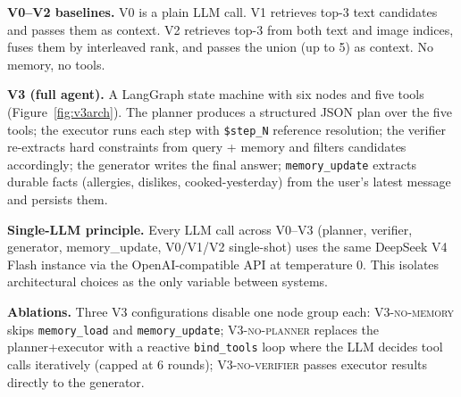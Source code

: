 \documentclass[sigconf, nonacm=true, anonymous=false]{acmart}
\begin{document}
\textbf{V0--V2 baselines.} V0 is a plain LLM call. V1 retrieves top-3
text candidates and passes them as context. V2 retrieves top-3 from both
text and image indices, fuses them by interleaved rank, and passes the
union (up to 5) as context. No memory, no tools.

\textbf{V3 (full agent).} A LangGraph \cite{langgraph} state machine
with six nodes and five tools (Figure~\ref{fig:v3arch}). The planner
produces a structured JSON plan over the five tools; the executor
runs each step with
\texttt{\$step\_N} reference resolution; the verifier re-extracts hard
constraints from query + memory and filters candidates accordingly; the
generator writes the final answer; \texttt{memory\_update} extracts
durable facts (allergies, dislikes, cooked-yesterday) from the user's
latest message and persists them.

\textbf{Single-LLM principle.} Every LLM call across V0--V3 (planner,
verifier, generator, memory\_update, V0/V1/V2 single-shot) uses the same
DeepSeek V4 Flash \cite{deepseek} instance via the OpenAI-compatible API
at temperature $0$. This isolates architectural choices as the only
variable between systems.

\textbf{Ablations.} Three V3 configurations disable one node group each:
\textsc{V3-no-memory} skips \texttt{memory\_load} and
\texttt{memory\_update}; \textsc{V3-no-planner} replaces the
planner+executor with a reactive \texttt{bind\_tools} loop where the LLM
decides tool calls iteratively (capped at 6 rounds); \textsc{V3-no-verifier}
passes executor results directly to the generator.
\end{document}
